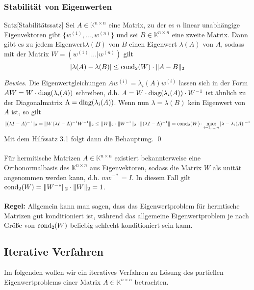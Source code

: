 \subsubsection{Stabilität von Eigenwerten}
\begin{thmbox}{Satz}[Stabilitätssatz]
    Sei $A\in\mathbb{K}^{n\times n}$ eine Matrix, zu der es $n$ linear unabhängige Eigenvektoren gibt 
    $\{w^{(1)},\dotsc,w^{(n)}\}$ und sei $B\in\mathbb{K}^{n\times n}$ eine zweite Matrix. Dann gibt es zu 
    jedem Eigenwert$\lambda(B)$ von $B$ einen Eigenwert $\lambda(A)$ von $A$, sodass mit der Matrix 
    $W=(w^{(1)}|\dotsc|w^{(n)})$ gilt
    \[|\lambda(A)-\lambda(B)|\leq\text{cond}_2(W)\cdot\|A-B\|_2\]
\end{thmbox}
\textit{Bewies.} Die Eigenwertgleichungen $Aw^{(i)}=\lambda_i(A)w^{(i)}$ lassen sich in der Form 
$AW=W\cdot\text{diag}(\lambda_i(A))$ schreiben, d.h. $A=W\cdot\text{diag}(\lambda_i(A))\cdot W^{-1}$ ist ähnlich zu der 
Diagonalmatrix $\Lambda = \text{diag}(\lambda_i(A))$. Wenn nun $\lambda=\lambda(B)$ kein Eigenwert von $A$ ist, so gilt 
\[\|(\lambda I - A)^{-1}\|_2 = \|W(\lambda I - \Lambda)^{-1}W^{-1}\|_2 
\leq \|W\|_2\cdot\|W^{-1}\|_2\cdot\|(\lambda I-\Lambda)^{-1}\| 
= \text{cond}_2(W)\cdot \max_{i=1,\dotsc,n} |\lambda-\lambda_i(A)|^{-1}\]
Mit dem Hilfssatz 3.1 folgt dann die Behauptung. \qed \\ \\
Für hermitische Matrizen $A\in\mathbb{K}^{n\times n}$ existiert bekannterweise eine Orthonormalbasis des 
$\mathbb{K}^{n\times n}$ aus Eigenvektoren, sodass die Matrix $W$ als unität angenommen werden kann, 
d.h. $ww^{-*}=I$. In diesem Fall gilt $\text{cond}_2(W)=\|W^{-*}\|_2\cdot\|W\|_2 = 1$. \\ \\
\textbf{Regel:} Allgemein kann man sagen, dass das Eigenwertproblem für hermtische Matrizen gut konditioniert
ist, während das allgemeine Eigenwertproblem je nach Größe von $\text{cond}_2(W)$ beliebig schlecht konditioniert 
sein kann.
\subsection{Iterative Verfahren}
Im folgenden wollen wir ein iteratives Verfahren zu Lösung des partiellen Eigenwertproblems einer 
Matrix $A\in\mathbb{K}^{n\times n}$ betrachten.
